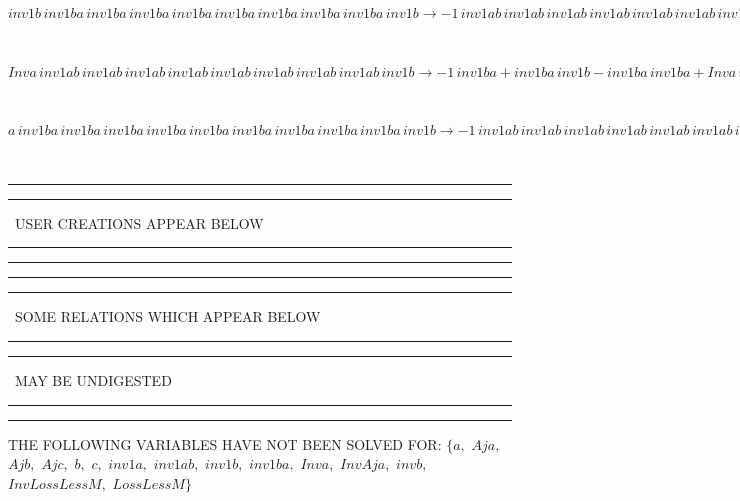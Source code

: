 \documentclass[rep10,leqno]{report}
\begin{document}
\begin{minipage}{6in}
$
inv1b\,
 inv1ba\,
 inv1ba\,
 inv1ba\,
 inv1ba\,
 inv1ba\,
 inv1ba\,
 inv1ba\,
 inv1ba\,
 inv1b\rightarrow -1\,
 inv1ab\,
 inv1ab\,
 inv1ab\,
 inv1ab\,
 inv1ab\,
 inv1ab\,
 inv1ab\,
 inv1ab\,
 inv1b + inv1b\,
 inv1ba\,
 inv1ba\,
 inv1ba\,
 inv1ba\,
 inv1ba\,
 inv1ba\,
 inv1ba\,
 inv1ba + inv1b\,
 inv1ab\,
 inv1ab\,
 inv1ab\,
 inv1ab\,
 inv1ab\,
 inv1ab\,
 inv1ab\,
 inv1ab\,
 inv1b
$
\end{minipage}\medskip \\
\begin{minipage}{6in}
$
Inva\,
 inv1ab\,
 inv1ab\,
 inv1ab\,
 inv1ab\,
 inv1ab\,
 inv1ab\,
 inv1ab\,
 inv1ab\,
 inv1b\rightarrow -1\,
 inv1ba + inv1ba\,
 inv1b - inv1ba\,
 inv1ba + Inva\,
 inv1b + inv1ba\,
 inv1ba\,
 inv1b - inv1ba\,
 inv1ba\,
 inv1ba + inv1ba\,
 inv1ba\,
 inv1ba\,
 inv1b - inv1ba\,
 inv1ba\,
 inv1ba\,
 inv1ba + inv1ba\,
 inv1ba\,
 inv1ba\,
 inv1ba\,
 inv1b - inv1ba\,
 inv1ba\,
 inv1ba\,
 inv1ba\,
 inv1ba + inv1ba\,
 inv1ba\,
 inv1ba\,
 inv1ba\,
 inv1ba\,
 inv1b - inv1ba\,
 inv1ba\,
 inv1ba\,
 inv1ba\,
 inv1ba\,
 inv1ba + inv1ba\,
 inv1ba\,
 inv1ba\,
 inv1ba\,
 inv1ba\,
 inv1ba\,
 inv1b - inv1ba\,
 inv1ba\,
 inv1ba\,
 inv1ba\,
 inv1ba\,
 inv1ba\,
 inv1ba + inv1ba\,
 inv1ba\,
 inv1ba\,
 inv1ba\,
 inv1ba\,
 inv1ba\,
 inv1ba\,
 inv1b - inv1ba\,
 inv1ba\,
 inv1ba\,
 inv1ba\,
 inv1ba\,
 inv1ba\,
 inv1ba\,
 inv1ba + inv1ba\,
 inv1ba\,
 inv1ba\,
 inv1ba\,
 inv1ba\,
 inv1ba\,
 inv1ba\,
 inv1ba\,
 inv1b
$
\end{minipage}\medskip \\
\begin{minipage}{6in}
$
a\,
 inv1ba\,
 inv1ba\,
 inv1ba\,
 inv1ba\,
 inv1ba\,
 inv1ba\,
 inv1ba\,
 inv1ba\,
 inv1ba\,
 inv1b\rightarrow -1\,
 inv1ab\,
 inv1ab\,
 inv1ab\,
 inv1ab\,
 inv1ab\,
 inv1ab\,
 inv1ab\,
 inv1ab\,
 inv1b + a\,
 inv1ba\,
 inv1ba\,
 inv1ba\,
 inv1ba\,
 inv1ba\,
 inv1ba\,
 inv1ba\,
 inv1ba\,
 inv1ba + inv1ab\,
 inv1ab\,
 inv1ab\,
 inv1ab\,
 inv1ab\,
 inv1ab\,
 inv1ab\,
 inv1ab\,
 inv1ab\,
 inv1b
$
\end{minipage}\\
\rule[2pt]{6in}{1pt}\hfil\break
\rule[2.5pt]{1.701in}{1pt}
\ USER CREATIONS APPEAR BELOW\ 
\rule[2.5pt]{1.701in}{1pt}\hfil\break
\rule[2pt]{6in}{1pt}\hfil\break
\rule[2pt]{6in}{4pt}\hfil\break
\rule[2pt]{1.45in}{4pt}
\ SOME RELATIONS WHICH APPEAR BELOW\ 
\rule[2pt]{1.45in}{4pt}\hfil\break
\rule[2pt]{2.18in}{4pt}
\ MAY BE UNDIGESTED\ 
\rule[2pt]{2.18in}{4pt}\hfil\break
\rule[2pt]{6in}{4pt}\hfil\break
THE FOLLOWING VARIABLES HAVE NOT BEEN SOLVED FOR:\hfil\break
$\{a,
$ $
Aja,
$ $
Ajb,
$ $
Ajc,
$ $
b,
$ $
c,
$ $
inv1a,
$ $
inv1ab,
$ $
inv1b,
$ $
inv1ba,
$ $
Inva,
$ $
InvAja,
$ $
invb,
$ $
InvLossLessM,
$ $
LossLessM\}$
\smallskip\\
\vspace{10pt}
\end{document}
